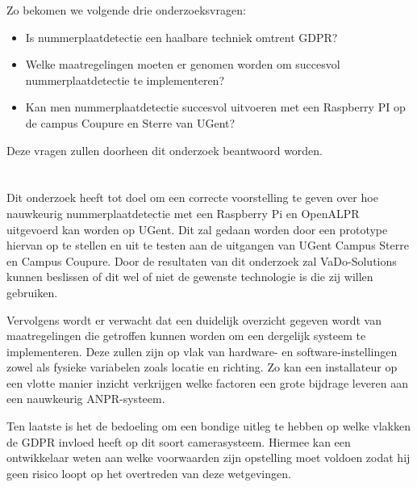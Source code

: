Zo bekomen we volgende drie onderzoeksvragen:
\begin{itemize}
	\item Is nummerplaatdetectie een haalbare techniek omtrent GDPR?
	\item Welke maatregelingen moeten er genomen worden om succesvol nummerplaatdetectie te implementeren?
	\item Kan men nummerplaatdetectie succesvol uitvoeren met een Raspberry PI op de campus Coupure en Sterre van UGent?
\end{itemize}

Deze vragen zullen doorheen dit onderzoek beantwoord worden.

\section{}
\label{sec:onderzoeksdoelstelling}


Dit onderzoek heeft tot doel om een correcte voorstelling te geven over hoe nauwkeurig nummerplaatdetectie met een Raspberry Pi en OpenALPR uitgevoerd kan worden op UGent. Dit zal gedaan worden door een prototype hiervan op te stellen en uit te testen aan de uitgangen van UGent Campus Sterre en Campus Coupure. Door de resultaten van dit onderzoek zal VaDo-Solutions kunnen beslissen of dit wel of niet de gewenste technologie is die zij willen gebruiken.

Vervolgens wordt er verwacht dat een duidelijk overzicht gegeven wordt van maatregelingen die getroffen kunnen worden om een dergelijk systeem te implementeren. Deze zullen zijn op vlak van hardware- en software-instellingen zowel als fysieke variabelen zoals locatie en richting. Zo kan een installateur op een vlotte manier inzicht verkrijgen welke factoren een grote bijdrage leveren aan een nauwkeurig ANPR-systeem.

Ten laatste is het de bedoeling om een bondige uitleg te hebben op welke vlakken de GDPR invloed heeft op dit soort camerasysteem. Hiermee kan een ontwikkelaar weten aan welke voorwaarden zijn opstelling moet voldoen zodat hij geen risico loopt op het overtreden van deze wetgevingen.

\section{}
\label{sec:opzet-bachelorproef}

